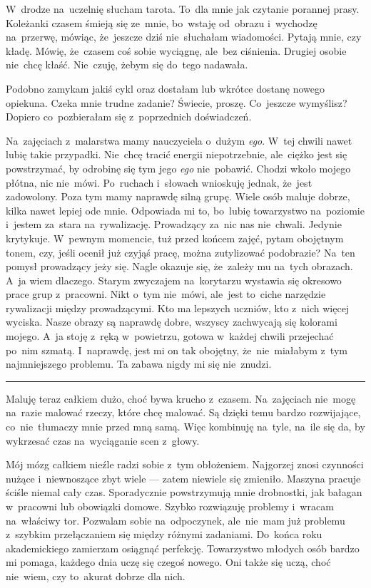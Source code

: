 \documentclass[9pt, a5paper]{memoir}
\begin{document}
W~drodze na~uczelnię słucham tarota. To~dla mnie jak czytanie porannej prasy. Koleżanki czasem śmieją się ze~mnie, bo~wstaję od~obrazu i~wychodzę na~przerwę, mówiąc, że~jeszcze dziś nie~słuchałam wiadomości. Pytają mnie, czy kładę. Mówię, że~czasem coś sobie wyciągnę, ale~bez ciśnienia. Drugiej osobie nie~chcę kłaść. Nie~czuję, żebym się do~tego nadawała.

Podobno zamykam jakiś cykl oraz dostałam lub wkrótce dostanę nowego opiekuna. Czeka mnie trudne zadanie? Świecie, proszę. Co~jeszcze wymyślisz? Dopiero co~pozbierałam się z~poprzednich doświadczeń.

Na~zajęciach z~malarstwa mamy nauczyciela o~dużym \textit{ego}. W~tej chwili nawet lubię takie przypadki. Nie~chcę tracić energii niepotrzebnie, ale~ciężko jest się powstrzymać, by odrobinę się tym jego \textit{ego} nie~pobawić. Chodzi wkoło mojego płótna, nic nie~mówi. Po~ruchach i~słowach wnioskuję jednak, że~jest zadowolony. Poza tym mamy naprawdę silną grupę. Wiele osób maluje dobrze, kilka nawet lepiej ode mnie. Odpowiada mi to, bo~lubię towarzystwo na~poziomie i~jestem za~stara na~rywalizację. Prowadzący za~nic nas nie~chwali. Jedynie krytykuje. W~pewnym momencie, tuż przed końcem zajęć, pytam obojętnym tonem, czy, jeśli ocenił już czyjąś pracę, można zutylizować podobrazie? Na~ten pomysł prowadzący jeży się. Nagle okazuje się, że~zależy mu na~tych obrazach. A~ja wiem dlaczego. Starym zwyczajem na~korytarzu wystawia się okresowo prace grup z~pracowni. Nikt o~tym nie~mówi, ale~jest to~ciche narzędzie rywalizacji między prowadzącymi. Kto ma lepszych uczniów, kto z~nich więcej wyciska. Nasze obrazy są naprawdę dobre, wszyscy zachwycają się kolorami mojego. A~ja stoję z~ręką w~powietrzu, gotowa w~każdej chwili przejechać po~nim szmatą. I~naprawdę, jest mi on tak obojętny, że~nie~miałabym z~tym najmniejszego problemu. Ta zabawa nigdy mi się nie~znudzi.

\fancybreak{* \quad * \quad *}

Maluję teraz całkiem dużo, choć bywa krucho z~czasem. Na~zajęciach nie~mogę na~razie malować rzeczy, które chcę malować. Są dzięki temu bardzo rozwijające, co~nie~tłumaczy mnie przed mną samą. Więc kombinuję na~tyle, na~ile się da, by wykrzesać czas na~wyciąganie scen z~głowy.

Mój mózg całkiem nieźle radzi sobie z~tym obłożeniem. Najgorzej znosi czynności nużące i~niewnoszące zbyt wiele --- zatem niewiele się zmieniło. Maszyna pracuje ściśle niemal cały czas. Sporadycznie powstrzymują mnie drobnostki, jak bałagan w~pracowni lub obowiązki domowe. Szybko rozwiązuję problemy i~wracam na~właściwy tor. Pozwalam sobie na~odpoczynek, ale~nie~mam już problemu z~szybkim przełączaniem się między różnymi zadaniami. Do~końca roku akademickiego zamierzam osiągnąć perfekcję. Towarzystwo młodych osób bardzo mi pomaga, każdego dnia uczę się czegoś nowego. Oni także się uczą, choć nie~wiem, czy to~akurat dobrze dla nich.
\end{document}
